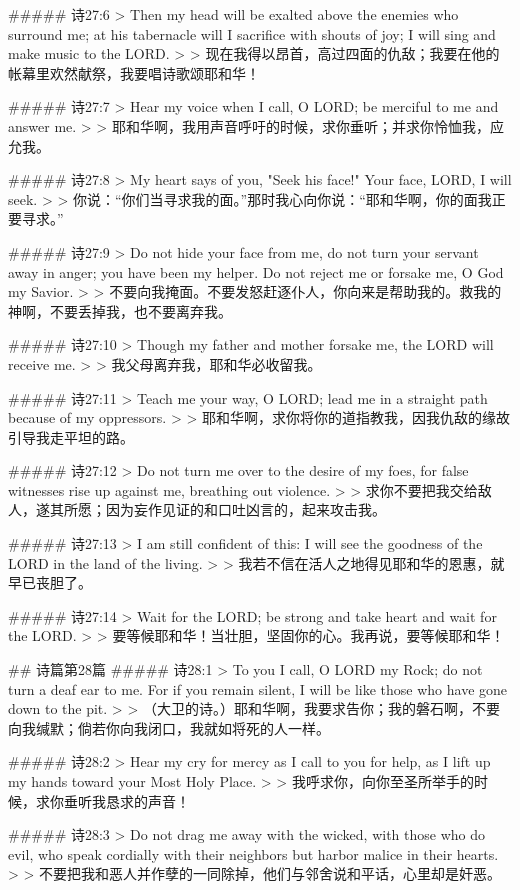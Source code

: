 ##### 诗27:6
> Then my head will be exalted above the enemies who surround me; at his tabernacle will I sacrifice with shouts of joy; I will sing and make music to the LORD.
>
> 现在我得以昂首，高过四面的仇敌；我要在他的帐幕里欢然献祭，我要唱诗歌颂耶和华！


##### 诗27:7
> Hear my voice when I call, O LORD; be merciful to me and answer me.
>
> 耶和华啊，我用声音呼吁的时候，求你垂听；并求你怜恤我，应允我。


##### 诗27:8
> My heart says of you, "Seek his face!" Your face, LORD, I will seek.
>
> 你说：“你们当寻求我的面。”那时我心向你说：“耶和华啊，你的面我正要寻求。”


##### 诗27:9
> Do not hide your face from me, do not turn your servant away in anger; you have been my helper. Do not reject me or forsake me, O God my Savior.
>
> 不要向我掩面。不要发怒赶逐仆人，你向来是帮助我的。救我的　神啊，不要丢掉我，也不要离弃我。


##### 诗27:10
> Though my father and mother forsake me, the LORD will receive me.
>
> 我父母离弃我，耶和华必收留我。


##### 诗27:11
> Teach me your way, O LORD; lead me in a straight path because of my oppressors.
>
> 耶和华啊，求你将你的道指教我，因我仇敌的缘故引导我走平坦的路。


##### 诗27:12
> Do not turn me over to the desire of my foes, for false witnesses rise up against me, breathing out violence.
>
> 求你不要把我交给敌人，遂其所愿；因为妄作见证的和口吐凶言的，起来攻击我。


##### 诗27:13
> I am still confident of this: I will see the goodness of the LORD in the land of the living.
>
> 我若不信在活人之地得见耶和华的恩惠，就早已丧胆了。


##### 诗27:14
> Wait for the LORD; be strong and take heart and wait for the LORD.
>
> 要等候耶和华！当壮胆，坚固你的心。我再说，要等候耶和华！


## 诗篇第28篇
##### 诗28:1
> To you I call, O LORD my Rock; do not turn a deaf ear to me. For if you remain silent, I will be like those who have gone down to the pit.
>
> （大卫的诗。）耶和华啊，我要求告你；我的磐石啊，不要向我缄默；倘若你向我闭口，我就如将死的人一样。


##### 诗28:2
> Hear my cry for mercy as I call to you for help, as I lift up my hands toward your Most Holy Place.
>
> 我呼求你，向你至圣所举手的时候，求你垂听我恳求的声音！


##### 诗28:3
> Do not drag me away with the wicked, with those who do evil, who speak cordially with their neighbors but harbor malice in their hearts.
>
> 不要把我和恶人并作孽的一同除掉，他们与邻舍说和平话，心里却是奸恶。


